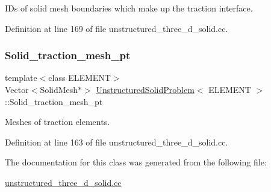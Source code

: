 I\+Ds of solid mesh boundaries which make up the traction interface. 



Definition at line 169 of file unstructured\+\_\+three\+\_\+d\+\_\+solid.\+cc.

\mbox{\label{classUnstructuredSolidProblem_a32e691a698667053003e21333fc65057}} 
\subsubsection{\texorpdfstring{Solid\+\_\+traction\+\_\+mesh\+\_\+pt}{Solid\_traction\_mesh\_pt}}
{\footnotesize\ttfamily template$<$class E\+L\+E\+M\+E\+NT$>$ \\
Vector$<$Solid\+Mesh$\ast$$>$ \hyperlink{classUnstructuredSolidProblem}{Unstructured\+Solid\+Problem}$<$ E\+L\+E\+M\+E\+NT $>$\+::Solid\+\_\+traction\+\_\+mesh\+\_\+pt\hspace{0.3cm}{\ttfamily [private]}}



Meshes of traction elements. 



Definition at line 163 of file unstructured\+\_\+three\+\_\+d\+\_\+solid.\+cc.



The documentation for this class was generated from the following file\+:\begin{DoxyCompactItemize}
\item 
\hyperlink{unstructured__three__d__solid_8cc}{unstructured\+\_\+three\+\_\+d\+\_\+solid.\+cc}\end{DoxyCompactItemize}
